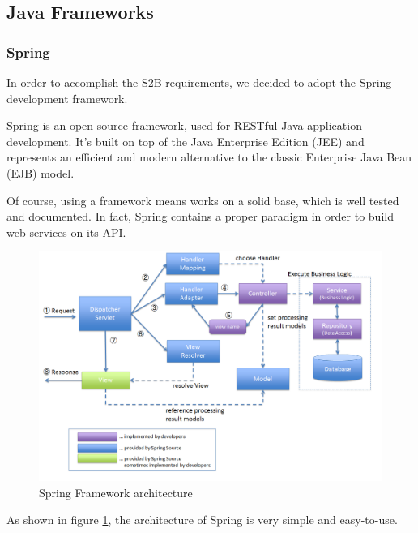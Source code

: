 \documentclass[table, 12pt]{article}
\begin{document}
\subsection{Java Frameworks}
\subsubsection{Spring}
In order to accomplish the S2B requirements, we decided to adopt the Spring development framework.

Spring is an open source framework, used for RESTful Java application development. It's built on top of the Java Enterprise Edition (JEE) and represents an efficient and modern alternative to the classic Enterprise Java Bean (EJB) model.

Of course, using a framework means works on a solid base, which is well tested and documented. In fact, Spring contains a proper paradigm in order to build web services on its API.

\begin{figure}
    \includegraphics[width=\textwidth]{assets/SpringArchitecture.png}
    \caption{Spring Framework architecture}
    \label{spring_architecture}
\end{figure}

As shown in figure \ref{spring_architecture}, the architecture of Spring is very simple and easy-to-use.
\end{document}
